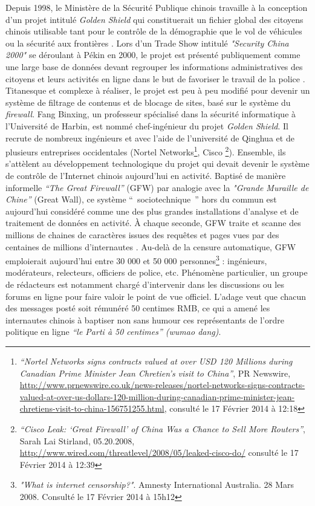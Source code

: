 Depuis 1998, le Ministère de la Sécurité Publique chinois travaille à la conception d’un projet intitulé \textit{Golden Shield} qui constituerait un fichier global des citoyens chinois utilisable tant pour le contrôle de la démographie que le vol de véhicules ou la sécurité aux frontières \citep{Lyons2009}. Lors d’un Trade Show intitulé \textit{"Security China 2000"} se déroulant à Pékin en 2000, le projet est présenté publiquement comme une large base de données devant regrouper les informations administratives des citoyens et leurs activités en ligne dans le but de favoriser le travail de la police \citep{Walton2001}. Titanesque et complexe à réaliser, le projet est peu à peu modifié pour devenir un système de filtrage de contenus et de blocage de sites, basé sur le système du \textit{firewall}. Fang Binxing, un professeur spécialisé dans la sécurité informatique à l’Université de Harbin, est nommé chef-ingénieur du projet \textit{Golden Shield}. Il recrute de nombreux ingénieurs et avec l’aide de l’université de Qinghua et de plusieurs entreprises occidentales (Nortel Networks\footnote{\textit{“Nortel Networks signs contracts valued at over USD 120 Millions during Canadian Prime Minister Jean Chretien’s visit to China”}, PR Newswire, \url{http://www.prnewswire.co.uk/news-releases/nortel-networks-signs-contracts-valued-at-over-us-dollars-120-million-during-canadian-prime-minister-jean-chretiens-visit-to-china-156751255.html}, consulté le 17 Février 2014 à 12:18}, Cisco \footnote{\textit{“Cisco Leak: ‘Great Firewall’ of China Was a Chance to Sell More Routers”}, 
Sarah Lai Stirland, 05.20.2008, \url{http://www.wired.com/threatlevel/2008/05/leaked-cisco-do/} consulté le 17 Février 2014 à 12:39}). Ensemble, ils s’attèlent au développement technologique du projet qui devait devenir le système de contrôle de l’Internet chinois aujourd’hui en activité. Baptisé de manière informelle \textit{“The Great Firewall”} (GFW) par analogie avec la \textit{"Grande Muraille de Chine”} (Great Wall), ce système `` sociotechnique '' hors du commun est aujourd’hui considéré comme une des plus grandes installations d’analyse et de traitement de données en activité. À chaque seconde, GFW traite et scanne des millions de chaines de caractères issues des requêtes et pages vues par des centaines de millions d’internautes \citep{Winter2012}. Au-delà de la censure automatique, GFW emploierait aujourd’hui entre 30 000 et 50 000 personnes\footnote{\textit{"What is internet censorship?"}. Amnesty International Australia. 28 Mars 2008. Consulté le 17 Février 2014 à 15h12} : ingénieurs, modérateurs, relecteurs, officiers de police, etc. Phénomène particulier, un groupe de rédacteurs est notamment chargé d’intervenir dans les discussions ou les forums en ligne pour faire valoir le point de vue officiel. L’adage veut que chacun des messages posté soit rémunéré 50 centimes RMB, ce qui a amené les internautes chinois à baptiser non sans humour ces représentants de l’ordre politique en ligne \textit{“le Parti à 50 centimes” (wumao dang)}.

